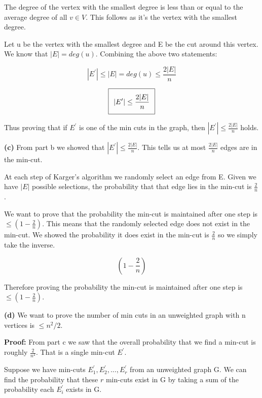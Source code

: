 \documentclass[11pt]{article}
\renewcommand\part[1]{\vspace{.10in}\textbf{(#1)}}
\begin{document}
The degree of the vertex with the smallest degree is less than or equal to the average degree of all $v \in V$. This follows as it's the vertex with the smallest degree.

Let u be the vertex with the smallest degree and E be the cut around this vertex. We know that $|E| = deg(u)$. Combining the above two statements:

$$|E^\prime| \leq |E| = deg(u) \leq \frac{2|E|}{n}$$

\begin{equation}
\setlength\fboxsep{0.25cm}
\setlength\fboxrule{0.4pt}
\boxed{|E^\prime| \leq \frac{2|E|}{n}}
\end{equation}

Thus proving that if $E^\prime$ is one of the min cuts in the graph, then $|E^\prime| \leq \frac{2|E|}{n}$ holds.

\part{c} From part b we showed that $|E^\prime| \leq \frac{2|E|}{n}$. This tells us at most $\frac{2|E|}{n}$ edges are in the min-cut.

At each step of Karger's algorithm we randomly select an edge from E. Given we have $|E|$ possible selections, the probability that that edge lies in the min-cut is $\frac{2}{n}$.

We want to prove that the probability the min-cut is maintained after one step is $\leq (1 - \frac{2}{n})$. This means that the randomly selected edge does not exist in the min-cut. We showed the probability it does exist in the min-cut is $\frac{2}{n}$ so we simply take the inverse.

$$(1 - \frac{2}{n})$$

Therefore proving the probability the min-cut is maintained after one step is $\leq (1 - \frac{2}{n})$.

\part{d} We want to prove the number of min cuts in an unweighted graph with n vertices is $\leq n^2/2$.

 \textbf{Proof:} From part c we saw that the overall probability that we find a min-cut is roughly $\frac{2}{n^2}$. That is a single min-cut $E^\prime$.
 
 Suppose we have min-cuts $E_1^\prime, E_2^\prime,...,E_r^\prime$ from an unweighted graph G. We can find the probability that these $r$ min-cuts exist in G by taking a sum of the probability each $E_i^\prime$ exists in G.
 
\end{document}
